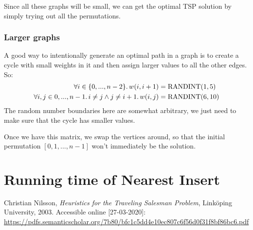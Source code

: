 \documentclass{article}
\newcommand{\randint}{\operatorname{RANDINT}}
\renewcommand{\thesection}{\Alph{section}}
\begin{document}
Since all these graphs will be small, we can get the optimal TSP solution by
simply trying out all the permutations.

\subsubsection{Larger graphs}

A good way to intentionally generate an optimal path in a graph is to create
a cycle with small weights in it and then assign larger values to all the other
edges. So:
\begin{align*}\forall i\in\{0,...,n-2\}\ldotp w(i,i+1) & =\randint(1,5)\\
  \forall i,j\in{0,...,n-1}\ldotp i\ne j \wedge j\ne i+1 \ldotp
  w(i,j) & = \randint(6,10) \\
\end{align*}
The random number boundaries here are somewhat arbitrary, we just need to make
sure that the cycle has smaller values.

Once we have this matrix, we swap the vertices around, so that the initial
permutation $[0,1,...,n-1]$ won't immediately be the solution.


\appendix
\renewcommand{\thesection}{$\Omega$\roman{section}}
\section{Running time of Nearest Insert}
\label{appendix:runtime-ni}



\begin{thebibliography}{9}
  Christian Nilsson,
  \textit{Heuristics for the Traveling Salesman Problem},
  Link\"oping University,
  2003.
  Accessible online [27-03-2020]: \url{https://pdfs.semanticscholar.org/7b80/bfc1c5dd4e10ec807c6f56d0f31f8bf86bc6.pdf}
\end{thebibliography}
\end{document}
